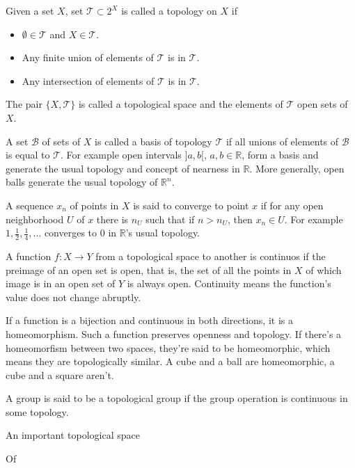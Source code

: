 \documentclass[11pt,oneside,%
]{memoir}
\theoremstyle{definition}
\newcommand{\RR}{\mathbb{R}}
\begin{document}
Given a set \(X\), set \(\mathcal{T}\subset2^X\) is called a topology on \(X\) if
\begin{itemize}
    \item \(\emptyset\in\mathcal{T}\) and \(X\in\mathcal{T}\).
    \item Any finite union of elements of \(\mathcal{T}\) is in \(\mathcal{T}\).
    \item Any intersection of elements of \(\mathcal{T}\) is in \(\mathcal{T}\).
\end{itemize}
The pair \(\lbrace X,\mathcal{T}\rbrace\) is called a topological space and the elements of \(\mathcal{T}\) open sets of \(X\).

A set \(\mathcal{B}\) of sets of \(X\) is called a basis of topology \(\mathcal{T}\) if all unions of elements of \(\mathcal{B}\) is equal to \(\mathcal{T}\). For example open intervals \(]a,b[\), \(a,b\in\RR\), form a basis and generate the usual topology and concept of nearness in \(\RR\). More generally, open balls generate the usual topology of \(\RR^n\).

A sequence \(x_n\) of points in \(X\) is said to converge to point \(x\) if for any open neighborhood \(U\) of \(x\) there is \(n_U\) such that if \(n>n_U\), then \(x_n\in U\). For example \(1,\frac{1}{2},\frac{1}{4},\dotsc\) converges to \(0\) in \(\RR\)'s usual topology.

A function \(f:X\rightarrow Y\) from a topological space to another is continuos if the preimage of an open set is open, that is, the set of all the points in \(X\) of which image is in an open set of \(Y\) is always open. Continuity means the function's value does not change abruptly.

If a function is a bijection and continuous in both directions, it is a homeomorphism. Such a function preserves openness and topology. If there's a homeomorfism between two spaces, they're said to be homeomorphic, which means they are topologically similar. A cube and a ball are homeomorphic, a cube and a square aren't.


A group is said to be a topological group if the group operation is continuous in some topology.

An important topological space


Of

\end{document}
